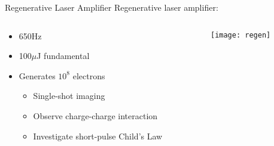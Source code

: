 \begin{frame}{Regenerative Laser Amplifier}
  Regenerative laser amplifier:
  \begin{columns}
    \begin{column}{0.49\linewidth}
      \begin{itemize}
        \item 650Hz
        \item 100$\mu$J fundamental
        \item<2-> [$\hookrightarrow$] Generates $10^8$ electrons
        \begin{itemize}
          \item<3-> Single-shot imaging
          \item<4-> Observe charge-charge interaction
          \item<5-> Investigate short-pulse Child's Law
        \end{itemize}
      \end{itemize}
    \end{column}
    \begin{column}{0.49\linewidth}
    \begin{center}
      \texttt{[image: regen]}
    \end{center}
    \end{column}
  \end{columns}
\end{frame}
